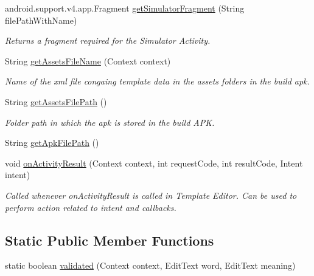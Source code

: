 \begin{DoxyCompactItemize}
\item 
android.\+support.\+v4.\+app.\+Fragment \hyperlink{classorg_1_1buildmlearn_1_1toolkit_1_1templates_1_1InfoTemplate_aee51629c5c43fe3bbdae36d00f851a90}{get\+Simulator\+Fragment} (String file\+Path\+With\+Name)
\begin{DoxyCompactList}\small\item\em Returns a fragment required for the Simulator Activity. \end{DoxyCompactList}\item 
String \hyperlink{classorg_1_1buildmlearn_1_1toolkit_1_1templates_1_1InfoTemplate_a6c132145c6028e0a0c28f90bb8b9d5c1}{get\+Assets\+File\+Name} (Context context)
\begin{DoxyCompactList}\small\item\em Name of the xml file congaing template data in the assets folders in the build apk. \end{DoxyCompactList}\item 
String \hyperlink{classorg_1_1buildmlearn_1_1toolkit_1_1templates_1_1InfoTemplate_a7d33c2515392865627720469c30726cc}{get\+Assets\+File\+Path} ()
\begin{DoxyCompactList}\small\item\em Folder path in which the apk is stored in the build A\+PK. \end{DoxyCompactList}\item 
String \hyperlink{classorg_1_1buildmlearn_1_1toolkit_1_1templates_1_1InfoTemplate_a2c1e9f1197aa092e46015da0ed060b6b}{get\+Apk\+File\+Path} ()
\item 
void \hyperlink{classorg_1_1buildmlearn_1_1toolkit_1_1templates_1_1InfoTemplate_a8089c34bead9e0dc798d5e14608e64fd}{on\+Activity\+Result} (Context context, int request\+Code, int result\+Code, Intent intent)
\begin{DoxyCompactList}\small\item\em Called whenever on\+Activity\+Result is called in Template Editor. Can be used to perform action related to intent and callbacks. \end{DoxyCompactList}\end{DoxyCompactItemize}
\subsection*{Static Public Member Functions}
\begin{DoxyCompactItemize}
\item 
static boolean \hyperlink{classorg_1_1buildmlearn_1_1toolkit_1_1templates_1_1InfoTemplate_a6b8cc6c46170f7d0be6be09093f58e41}{validated} (Context context, Edit\+Text word, Edit\+Text meaning)
\end{DoxyCompactItemize}
